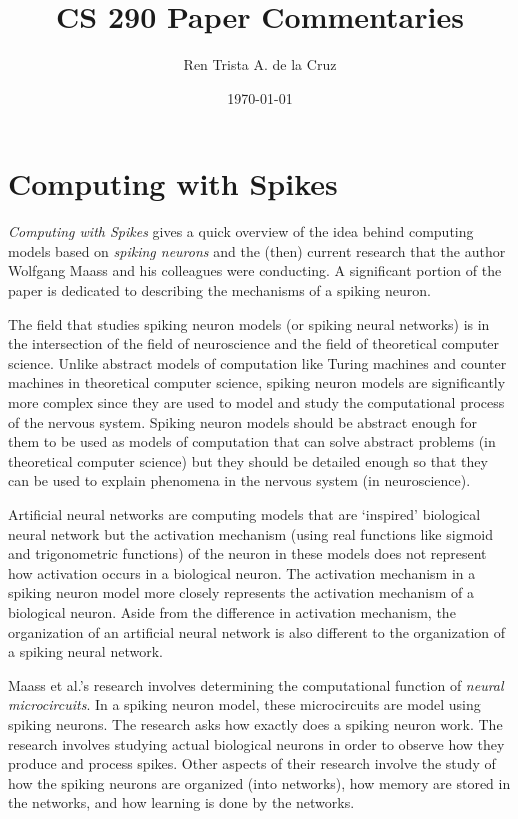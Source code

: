 \documentclass[12pt,A4]{article}
\title
{
   CS 290 Paper Commentaries
}
\author
{
   Ren Trista A. de la Cruz
}
\date
{
   \today
}
\begin{document}
\maketitle


\section*{Computing with Spikes}

\emph{Computing with Spikes} \cite{maass-2002-comp-spike} gives a quick overview of the idea behind 
computing models based on \emph{spiking neurons} and the (then) current research that the author
Wolfgang Maass and his colleagues were conducting. A significant portion of the paper is dedicated
to describing the mechanisms of a spiking neuron.

The field that studies spiking neuron models (or spiking neural networks) is in the intersection of 
the field of neuroscience and the field of theoretical computer science. Unlike abstract models of 
computation like Turing  machines and counter machines in theoretical computer science, spiking 
neuron models are significantly more complex since they are used to model and study the
computational process of the nervous system. Spiking neuron models should be abstract enough for 
them to be used as models of computation that can solve abstract problems (in theoretical computer
science) but they should be detailed enough so that they can be used to explain phenomena in the
nervous system (in neuroscience).

Artificial neural networks are computing models that are `inspired' biological neural network but the 
activation mechanism (using real functions like sigmoid and trigonometric functions) of the neuron 
in these models does not represent how activation occurs in a biological neuron. The activation 
mechanism in a spiking neuron model more closely represents the activation mechanism of a biological 
neuron. Aside from the difference in activation mechanism, the organization of an artificial neural 
network is also different to the organization of a spiking neural network.  

Maass et al.'s research involves determining the computational function of \emph{neural 
microcircuits}. In a spiking neuron model, these microcircuits are model using spiking neurons. The 
research asks how exactly does a spiking neuron work. The research involves studying actual
biological neurons in order to observe how they produce and process spikes. Other aspects of their 
research involve the study of how the spiking neurons are organized (into networks), how memory are
stored in the networks, and how learning is done by the networks. 
\end{document}
